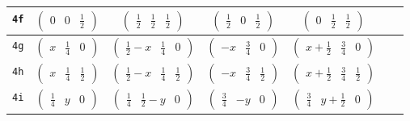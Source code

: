 \documentclass[fleqn,9pt,landscape]{jsarticle}
\begin{document}
\begin{center}
\begin{longtable}{ccccccc}
{\tt 4f} & $ \begin{pmatrix} 0 & 0 & \frac{1}{2} \end{pmatrix} $ & $ \begin{pmatrix} \frac{1}{2} & \frac{1}{2} & \frac{1}{2} \end{pmatrix} $ & $ \begin{pmatrix} \frac{1}{2} & 0 & \frac{1}{2} \end{pmatrix} $ & $ \begin{pmatrix} 0 & \frac{1}{2} & \frac{1}{2} \end{pmatrix} $ & $  $ & $  $ \\ \hline
{\tt 4g} & $ \begin{pmatrix} x & \frac{1}{4} & 0 \end{pmatrix} $ & $ \begin{pmatrix} \frac{1}{2} - x & \frac{1}{4} & 0 \end{pmatrix} $ & $ \begin{pmatrix} - x & \frac{3}{4} & 0 \end{pmatrix} $ & $ \begin{pmatrix} x + \frac{1}{2} & \frac{3}{4} & 0 \end{pmatrix} $ & $  $ & $  $ \\ \hline
{\tt 4h} & $ \begin{pmatrix} x & \frac{1}{4} & \frac{1}{2} \end{pmatrix} $ & $ \begin{pmatrix} \frac{1}{2} - x & \frac{1}{4} & \frac{1}{2} \end{pmatrix} $ & $ \begin{pmatrix} - x & \frac{3}{4} & \frac{1}{2} \end{pmatrix} $ & $ \begin{pmatrix} x + \frac{1}{2} & \frac{3}{4} & \frac{1}{2} \end{pmatrix} $ & $  $ & $  $ \\ \hline
{\tt 4i} & $ \begin{pmatrix} \frac{1}{4} & y & 0 \end{pmatrix} $ & $ \begin{pmatrix} \frac{1}{4} & \frac{1}{2} - y & 0 \end{pmatrix} $ & $ \begin{pmatrix} \frac{3}{4} & - y & 0 \end{pmatrix} $ & $ \begin{pmatrix} \frac{3}{4} & y + \frac{1}{2} & 0 \end{pmatrix} $ & $  $ & $  $ \\ \hline

\end{longtable}
\end{center}
\end{document}
